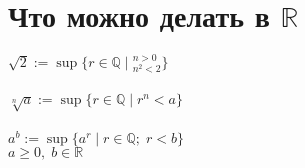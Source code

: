 \documentclass[a4paper, 12pt]{article}
\begin{document}
 
	\section*{Что можно делать в $\mathbb{R}$}
	
	$ \sqrt{2} := \sup\{r \in \mathbb{Q} \; |\; ^{n > 0}_{n^{2} < 2} \} $\\
	\\
	$ \sqrt[n]{a} := \sup\{r \in \mathbb{Q} \; |\; r^{n} < a \} $\\
	\\
	$a^{b} := \sup\{a^{r} \; | \; r \in \mathbb{Q}; \; r < b \} $\\
	$a \ge 0, \; b \in \mathbb{R}$
\end{document}
